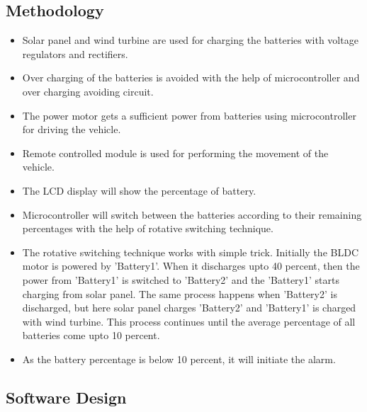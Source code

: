 \documentclass[a4paper,12pt]{article}
\begin{document}
\subsection{Methodology}
\begin{itemize}
\item Solar panel and wind turbine are used for charging the batteries with voltage
regulators and rectifiers.

\item Over charging of the batteries is avoided with the help of microcontroller and over
charging avoiding circuit.

\item The power motor gets a sufficient power from batteries using microcontroller for
driving the vehicle.

\item Remote controlled module is used for performing the movement of the vehicle.

\item The LCD display will show the percentage of battery.

\item Microcontroller will switch between the batteries according to their remaining
percentages with the help of rotative switching technique.

\item The rotative switching technique works with simple trick. Initially the BLDC motor is powered by 'Battery1'. When it discharges upto 40 percent, then the power from 'Battery1' is switched to 'Battery2' and the 'Battery1' starts charging from solar panel. The same process happens when 'Battery2' is discharged, but here solar panel charges 'Battery2' and 'Battery1' is charged with wind turbine. This process continues until the average percentage of all batteries come upto 10 percent.

\item As the battery percentage is below 10 percent, it will initiate the alarm.
\end{itemize}

\newpage
\subsection{Software Design}
\end{document}
